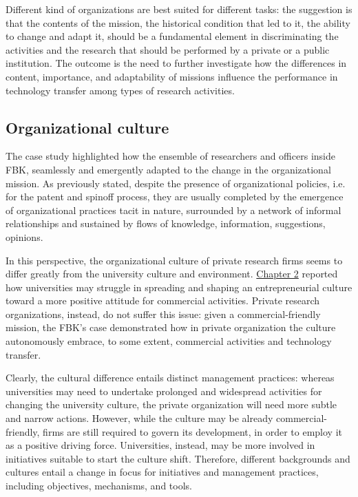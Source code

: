 Different kind of organizations are best suited for different tasks: the suggestion is that the contents of the mission, the historical condition that led to it, the ability to change and adapt it, should be a fundamental element in discriminating the activities and the research that should be performed by a private or a public institution. The outcome is the need to further investigate how the differences in content, importance, and adaptability of missions influence the performance in technology transfer among types of research activities.

\subsection{Organizational culture}

The case study highlighted how the ensemble of researchers and officers inside FBK, seamlessly and emergently adapted to the change in the organizational mission. As previously stated, despite the presence of organizational policies, i.e. for the patent and spinoff process, they are usually completed by the emergence of organizational practices tacit in nature, surrounded by a network of informal relationships and sustained by flows of knowledge, information, suggestions, opinions. 

In this perspective, the organizational culture of private research firms seems to differ greatly from the university culture and environment. \hyperref[Chapter2]{Chapter 2} reported how universities may struggle in spreading and shaping an entrepreneurial culture toward a more positive attitude for commercial activities. Private research organizations, instead, do not suffer this issue: given a commercial-friendly mission, the FBK's case demonstrated how in private organization the culture autonomously embrace, to some extent, commercial activities and technology transfer. 

Clearly, the cultural difference entails distinct management practices: whereas universities may need to undertake prolonged and widespread activities for changing the university culture, the private organization will need more subtle and narrow actions. However, while the culture may be already commercial-friendly, firms are still required to govern its development, in order to employ it as a positive driving force. Universities, instead, may be more involved in initiatives suitable to start the culture shift. Therefore, different backgrounds and cultures entail a change in focus for initiatives and management practices, including objectives, mechanisms, and tools.

